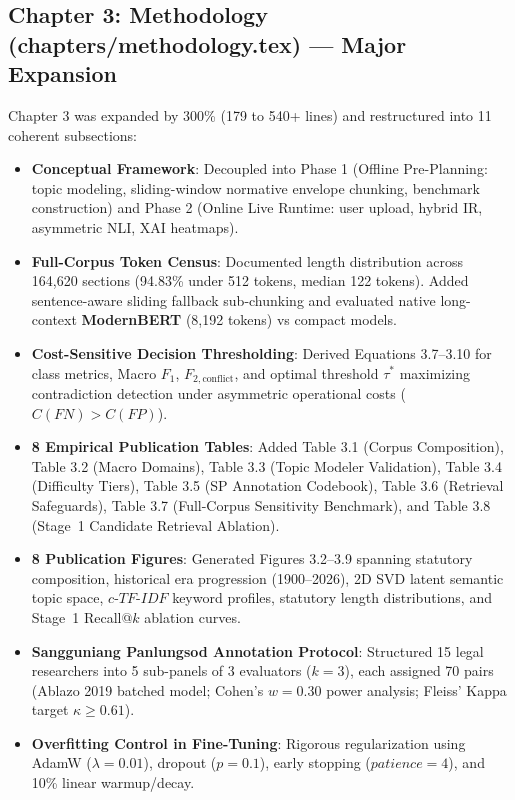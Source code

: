 \documentclass[10pt,letterpaper]{article}
\begin{document}
\subsection{Chapter 3: Methodology (chapters/methodology.tex) --- Major Expansion}
Chapter 3 was expanded by 300\% (179 to 540+ lines) and restructured into 11 coherent subsections:
\begin{itemize}
    \item \textbf{Conceptual Framework}: Decoupled into Phase 1 (Offline Pre-Planning: topic modeling, sliding-window normative envelope chunking, benchmark construction) and Phase 2 (Online Live Runtime: user upload, hybrid IR, asymmetric NLI, XAI heatmaps).
    \item \textbf{Full-Corpus Token Census}: Documented length distribution across 164,620 sections (94.83\% under 512 tokens, median 122 tokens). Added sentence-aware sliding fallback sub-chunking and evaluated native long-context \textbf{ModernBERT} (8,192 tokens) vs compact models.
    \item \textbf{Cost-Sensitive Decision Thresholding}: Derived Equations 3.7--3.10 for class metrics, Macro $F_1$, $F_{2,\text{conflict}}$, and optimal threshold $\tau^*$ maximizing contradiction detection under asymmetric operational costs ($C(FN) > C(FP)$).
    \item \textbf{8 Empirical Publication Tables}: Added Table 3.1 (Corpus Composition), Table 3.2 (Macro Domains), Table 3.3 (Topic Modeler Validation), Table 3.4 (Difficulty Tiers), Table 3.5 (SP Annotation Codebook), Table 3.6 (Retrieval Safeguards), Table 3.7 (Full-Corpus Sensitivity Benchmark), and Table 3.8 (Stage~1 Candidate Retrieval Ablation).
    \item \textbf{8 Publication Figures}: Generated Figures 3.2--3.9 spanning statutory composition, historical era progression (1900--2026), 2D SVD latent semantic topic space, $c\text{-}TF\text{-}IDF$ keyword profiles, statutory length distributions, and Stage~1 Recall@$k$ ablation curves.
    \item \textbf{Sangguniang Panlungsod Annotation Protocol}: Structured 15 legal researchers into 5 sub-panels of 3 evaluators ($k=3$), each assigned 70 pairs (Ablazo 2019 batched model; Cohen's $w=0.30$ power analysis; Fleiss' Kappa target $\kappa \ge 0.61$).
    \item \textbf{Overfitting Control in Fine-Tuning}: Rigorous regularization using AdamW ($\lambda=0.01$), dropout ($p=0.1$), early stopping ($patience=4$), and 10\% linear warmup/decay.
\end{itemize}
\end{document}
